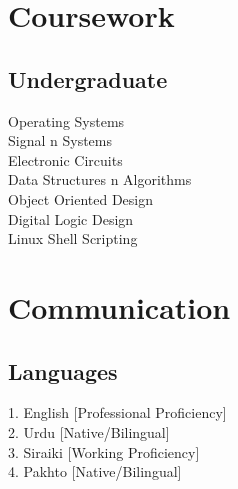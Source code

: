 \documentclass[]{deedy-resume-openfont}
\begin{document}
\begin{minipage}[t]{0.33\textwidth}

\section{Coursework}
\subsection{Undergraduate}
Operating Systems \\
Signal n Systems \\
Electronic Circuits \\
Data Structures n Algorithms \\
Object Oriented Design \\
Digital Logic Design \\ 
Linux Shell Scripting \\



\section{Communication}
\subsection{Languages}
1. English [Professional Proficiency]\\
2. Urdu  [Native/Bilingual]\\
3. Siraiki [Working Proficiency]\\
4. Pakhto [Native/Bilingual]\\
\sectionsep


\end{minipage}
\end{document}
